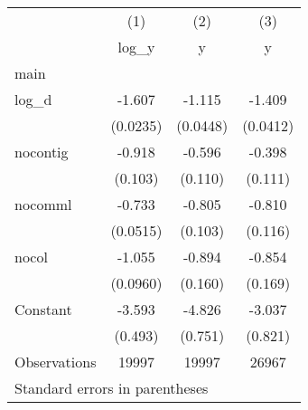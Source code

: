 \begin{tabular}{l*{3}{c}}
\toprule
                    &\multicolumn{1}{c}{(1)}&\multicolumn{1}{c}{(2)}&\multicolumn{1}{c}{(3)}\\
                    &\multicolumn{1}{c}{log\_y}&\multicolumn{1}{c}{y}&\multicolumn{1}{c}{y}\\
\midrule
main                &            &            &            \\
log\_d               &      -1.607&      -1.115&      -1.409\\
                    &    (0.0235)&    (0.0448)&    (0.0412)\\
\addlinespace
nocontig            &      -0.918&      -0.596&      -0.398\\
                    &     (0.103)&     (0.110)&     (0.111)\\
\addlinespace
nocomml             &      -0.733&      -0.805&      -0.810\\
                    &    (0.0515)&     (0.103)&     (0.116)\\
\addlinespace
nocol               &      -1.055&      -0.894&      -0.854\\
                    &    (0.0960)&     (0.160)&     (0.169)\\
\addlinespace
Constant            &      -3.593&      -4.826&      -3.037\\
                    &     (0.493)&     (0.751)&     (0.821)\\
\midrule
Observations        &       19997&       19997&       26967\\
\bottomrule
\multicolumn{4}{l}{\footnotesize Standard errors in parentheses}\\
\end{tabular}
